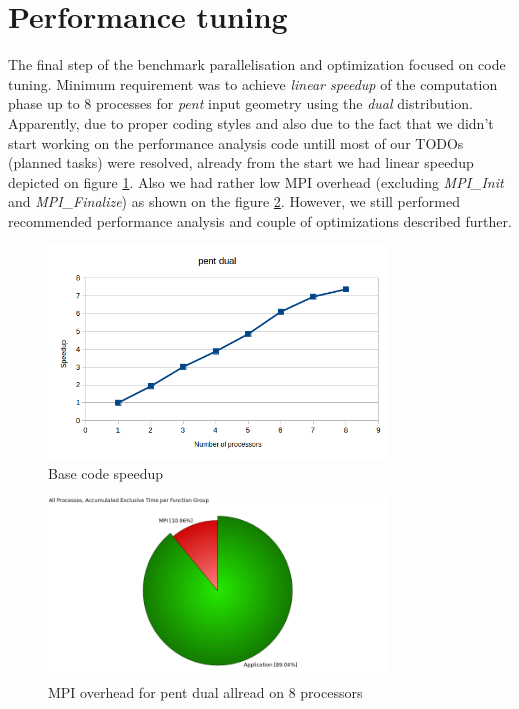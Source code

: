 \documentclass{article}
\begin{document}
\section{Performance tuning}
The final step of the benchmark parallelisation and optimization focused on code tuning. Minimum requirement was to achieve \textit{linear speedup} of the computation phase up to 8 processes for \textit{pent} input geometry using the \textit{dual} distribution. Apparently, due to proper coding styles and also due to the fact that we didn't start working on the performance analysis code untill most of our TODOs (planned tasks) were resolved, already from the start we had linear speedup depicted on figure \ref{fig:11}. Also we had rather low MPI overhead (excluding \textit{MPI\_Init} and \textit{MPI\_Finalize}) as shown on the figure \ref{fig:12}. However, we still performed recommended performance analysis and couple of optimizations described further.
\begin{figure}[h!]
	\begin{center}
		\includegraphics[width=0.8\textwidth]{pent_computation_speedup_1-8proc.png}
		\caption{Base code speedup}
		\label{fig:11}
	\end{center}
\end{figure}
\begin{figure}[h!]
	\begin{center}
		\includegraphics[width=0.8\textwidth]{no_mpi_init_finalize-pent-dual-allread-8-Function_Summary_traces.png}
		\caption{MPI overhead for pent dual allread on 8 processors}
		\label{fig:12}
	\end{center}
\end{figure}
\end{document}
